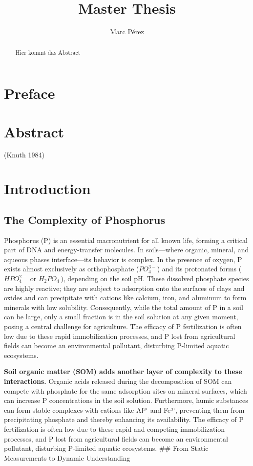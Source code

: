 \documentclass[
  a4paper,
]{article}
\title{Master Thesis}
\author{Marc Pérez}
\date{}
\begin{document}
\maketitle
\begin{abstract}
Hier kommt das Abstract
\end{abstract}


\section{Preface}\label{preface}

\section{Abstract}\label{abstract}

(Knuth 1984)

\section{Introduction}\label{introduction}

\subsection{The Complexity of
Phosphorus}\label{the-complexity-of-phosphorus}

Phosphorus (P) is an essential macronutrient for all known life, forming
a critical part of DNA and energy-transfer molecules. In soils---where
organic, mineral, and aqueous phases interface---its behavior is
complex. In the presence of oxygen, P exists almost exclusively as
orthophosphate (\(PO_4^{3-}\)) and its protonated forms (\(HPO_4^{2-}\)
or \(H_2PO_4^{-}\)), depending on the soil pH. These dissolved phosphate
species are highly reactive; they are subject to adsorption onto the
surfaces of clays and oxides and can precipitate with cations like
calcium, iron, and aluminum to form minerals with low solubility.
Consequently, while the total amount of P in a soil can be large, only a
small fraction is in the soil solution at any given moment, posing a
central challenge for agriculture. The efficacy of P fertilization is
often low due to these rapid immobilization processes, and P lost from
agricultural fields can become an environmental pollutant, disturbing
P-limited aquatic ecosystems.

\textbf{Soil organic matter (SOM) adds another layer of complexity to
these interactions.} Organic acids released during the decomposition of
SOM can compete with phosphate for the same adsorption sites on mineral
surfaces, which can increase P concentrations in the soil solution.
Furthermore, humic substances can form stable complexes with cations
like Al³⁺ and Fe³⁺, preventing them from precipitating phosphate and
thereby enhancing its availability. The efficacy of P fertilization is
often low due to these rapid and competing immobilization processes, and
P lost from agricultural fields can become an environmental pollutant,
disturbing P-limited aquatic ecosystems. \#\# From Static Measurements
to Dynamic Understanding
\end{document}
